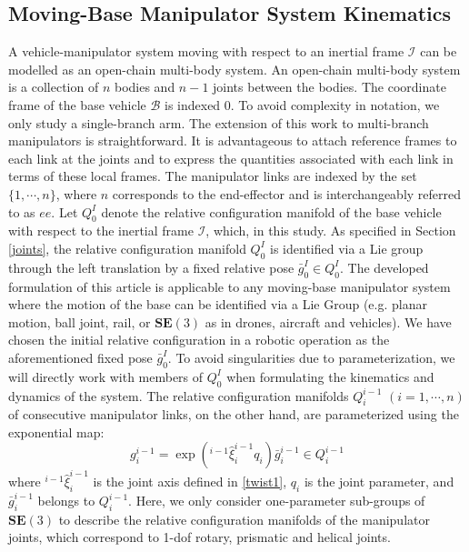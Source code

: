 \documentclass[lettersize,journal]{IEEEtran}
\def \SE {\textbf{SE}(3)}
\def  \B {\mathcal{B}}
\begin{document}
\subsection{Moving-Base Manipulator System Kinematics}\label{kinematics}
A vehicle-manipulator system moving with respect to an inertial frame $\mathcal{I}$ can be modelled as an open-chain multi-body system. An open-chain multi-body system is a collection of $n$ bodies and $n-1$ joints between the bodies. The coordinate frame of the base vehicle $\B$ is indexed $0$. To avoid complexity in notation, we only study a single-branch arm. The extension of this work to multi-branch manipulators is straightforward. It is advantageous to attach reference frames to each link at the joints and to express the quantities associated with each link in terms of these local frames. The manipulator links are indexed by the set $\{1,\cdots,n\}$, where $n$ corresponds to the end-effector and is interchangeably referred to as $ee$.
Let $Q^I_0$ denote the relative configuration manifold of the base vehicle with respect to the inertial frame $\mathcal{I}$, which, in this study. As specified in Section \ref{joints}, the relative configuration manifold $Q^{I}_0$ is identified via a Lie group through the left translation by a fixed relative pose $\bar{g}^I_0{} \in Q_0^I$. The developed formulation of this article is applicable to any moving-base manipulator system where the motion of the base can be identified via a Lie Group (e.g. planar motion, ball joint, rail, or $\SE$ as in drones, aircraft and vehicles). We have chosen the initial relative configuration in a robotic operation as the aforementioned fixed pose $\bar{g}^I_0{}$. To avoid singularities due to parameterization, we will directly work with members of $Q^I_0$ when formulating the kinematics and dynamics of the system. %
The relative configuration manifolds $Q^{i-1}_i $ $(i=1, \cdots, n) $ of consecutive manipulator links, on the other hand, are parameterized using the exponential map: $$g_i^{i-1}=\exp{({}^{i-1}\hat{\xi}^{i-1}_iq_i)}\bar{g}^{i-1}_i\in Q_i^{i-1}$$ where ${}^{i-1}\hat{\xi}^{i-1}_i$ is the joint axis defined in \eqref{twist1}, $q_i$ is the joint parameter, and $\bar{g}^{i-1}_i$ belongs to $Q^{i-1}_i$. Here, we only consider one-parameter sub-groups of $\SE$ to describe the relative configuration manifolds of the manipulator joints, which correspond to 1-dof rotary, prismatic and helical joints. %
\end{document}
